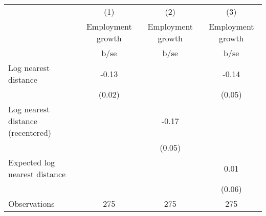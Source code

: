 {
\def\sym#1{\ifmmode^{#1}\else\(^{#1}\)\fi}
\begin{tabular}{l*{3}{c}}
\hline\hline
                                                  &\multicolumn{1}{c}{(1)}&\multicolumn{1}{c}{(2)}&\multicolumn{1}{c}{(3)}\\
                                                  &\multicolumn{1}{c}{Employment growth}&\multicolumn{1}{c}{Employment growth}&\multicolumn{1}{c}{Employment growth}\\
                                                  &        b/se&        b/se&        b/se\\
\hline
Log nearest distance                              &       -0.13&            &       -0.14\\
                                                  &      (0.02)&            &      (0.05)\\
Log nearest distance (recentered)                 &            &       -0.17&            \\
                                                  &            &      (0.05)&            \\
Expected log nearest distance                     &            &            &        0.01\\
                                                  &            &            &      (0.06)\\
\hline
Observations                                      &         275&         275&         275\\
\hline\hline
\end{tabular}
}
